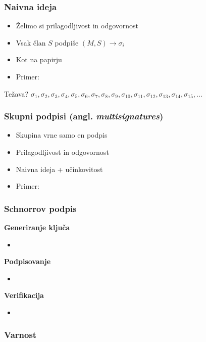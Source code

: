 \documentclass{beamer}    %
\begin{document}
\begin{frame}
    \frametitle{Naivna ideja}
    \begin{itemize}
        \item Želimo si prilagodljivost in odgovornost
        \item Vsak član $S$ podpiše $(M, S) \rightarrow \sigma_i$
        \item Kot na papirju
        \item Primer:
    \end{itemize}
    \vspace{1cm}
    \pause
    Težava?
        $\sigma_1, \sigma_2, \sigma_3, \sigma_4, \sigma_5, \sigma_6,
        \sigma_7,  \sigma_8, \sigma_9, \sigma_{10}, \sigma_{11}, \sigma_{12}, 
        \sigma_{13}, \sigma_{14}, \sigma_{15}, \dots$
\end{frame}

\begin{frame}
    \frametitle{Skupni podpisi (angl. \textit{multisignatures})}
    \begin{itemize}
        \item Skupina vrne samo en podpis
        \item Prilagodljivost in odgovornost
        \item Naivna ideja + učinkovitost
        \item Primer:
    \end{itemize}
\end{frame}

\begin{frame}
    \frametitle{Schnorrov podpis}
    \textbf{Generiranje ključa} \\
    \begin{itemize}
        \item 
    \end{itemize}
    \textbf{Podpisovanje} \\
    \begin{itemize}
        \item 
    \end{itemize}
    \textbf{Verifikacija}
    \begin{itemize}
        \item 
    \end{itemize}
\end{frame}

\begin{frame}
    \frametitle{Varnost}
\end{frame}
\end{document}

